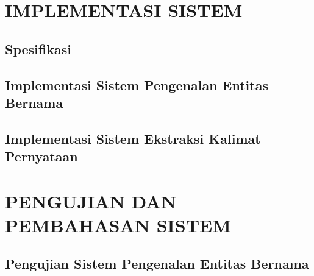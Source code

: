 \documentclass[ugmskripsi]{ugmskripsi}
\begin{document}


\chapter{IMPLEMENTASI SISTEM}
\label{IMPLEMENTASI SISTEM}

	\section{Spesifikasi}
	\label{implementasi spesifikasi}
	

	\section{Implementasi Sistem Pengenalan Entitas Bernama}
	\label{implementasi sistem ner}
	

	\section{Implementasi Sistem Ekstraksi Kalimat Pernyataan}
	\label{implementasi sistem ekstraksi kalimat pernyataan}
	




\chapter{PENGUJIAN DAN PEMBAHASAN SISTEM}
\label{PENGUJIAN DAN PEMBAHASAN SISTEM}


	\section{Pengujian Sistem Pengenalan Entitas Bernama}
	\label{pengujian sistem ner}
	
\end{document}
